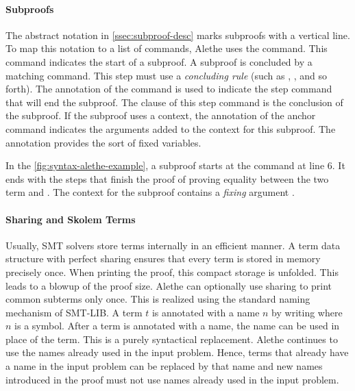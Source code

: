 \paragraph{Subproofs}
The abstract notation in \cref{ssec:subproof-desc} marks subproofs with a vertical line.
To map this notation to a list of commands, Alethe uses the  command.
This command indicates the start of a subproof. A subproof is concluded by a matching  command.
This step must use a \emph{concluding rule} (such as , , and so forth).
The  annotation of the  command is used to indicate the step command that will end the subproof.
The clause of this step command is the conclusion of the subproof.
If the subproof uses a context, the  annotation of the anchor command indicates the arguments added to the context for this subproof.
The annotation provides the sort of fixed variables.

In the \cref{fig:syntax-alethe-example}, a subproof starts at the  command at line 6.
It ends with the  steps that finish the proof of proving equality between the two term  and .
The context for the subproof  contains a \emph{fixing} argument .

\paragraph{Sharing and Skolem Terms}

Usually, SMT solvers store terms internally in an efficient manner.
A term data structure with perfect sharing ensures that every term is stored in memory precisely once.
When printing the proof, this compact storage is unfolded. This leads to a blowup of the proof size.
Alethe can optionally use sharing to print common subterms only once.
This is realized using the standard naming mechanism of SMT-LIB. A term $t$
is annotated with a name $n$ by writing  where $n$ is a symbol.
After a term is annotated with a name, the name can be used in place of the term.
This is a purely syntactical replacement.
Alethe continues to use the names already used in the input problem.
Hence, terms that already have a name in the input problem can be replaced by that name and new
names introduced in the proof must not use names already used in the input problem.

